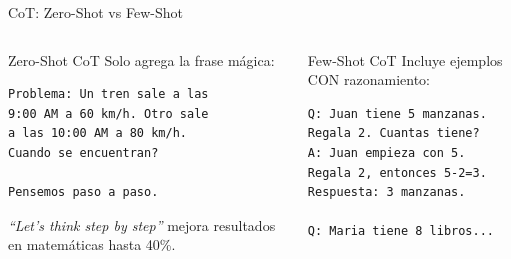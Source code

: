 \documentclass[aspectratio=169]{beamer}
\begin{document}
\begin{frame}[fragile]{CoT: Zero-Shot vs Few-Shot}
    \begin{columns}
        \begin{block}{Zero-Shot CoT}
            Solo agrega la frase mágica:
\begin{lstlisting}[style=promptstyle]
Problema: Un tren sale a las 
9:00 AM a 60 km/h. Otro sale 
a las 10:00 AM a 80 km/h. 
Cuando se encuentran?

Pensemos paso a paso.
\end{lstlisting}
            
            \vspace{0.2cm}
            \textit{``Let's think step by step''} mejora resultados en matemáticas hasta 40\%.
        \end{block}
        
        \begin{block}{Few-Shot CoT}
            Incluye ejemplos CON razonamiento:
\begin{lstlisting}[style=promptstyle]
Q: Juan tiene 5 manzanas. 
Regala 2. Cuantas tiene?
A: Juan empieza con 5.
Regala 2, entonces 5-2=3.
Respuesta: 3 manzanas.

Q: Maria tiene 8 libros...
\end{lstlisting}
        \end{block}
    \end{columns}
\end{frame}
\end{document}
